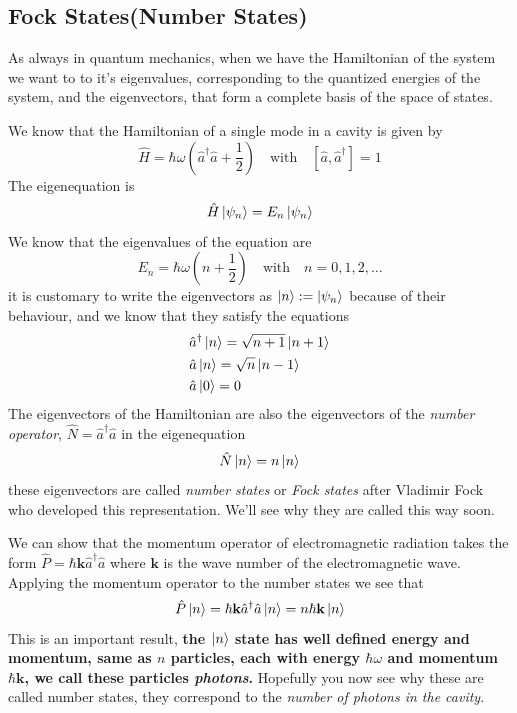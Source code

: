 \documentclass[english, a4paper, 12pt, twoside]{article}
\numberwithin{equation}{section} %
\begin{document}

\subsection{Fock States(Number States)}
As always in quantum mechanics, when we have the Hamiltonian of the system we want to to it's eigenvalues, corresponding to the quantized energies of the system, and the eigenvectors, that form a complete basis of the space of states.

We know that the Hamiltonian of a single mode in a cavity is given by
\[
    \hat{H} = \hbar \omega (\hat{a}^\dag \hat{a} + \frac{1}{2}) \quad \text{with} \quad [\hat{a}, \hat{a}^\dag] = 1
\]
The eigenequation is
\[
    \hat{H}\ket{\psi_n} = E_n \ket{\psi_n}
\]
We know that the eigenvalues of the equation are
\[
    E_n = \hbar \omega (n + \frac{1}{2}) \quad \text{with} \quad n = 0, 1, 2, \dots
\]
it is customary to write the eigenvectors as $\ket{n} := \ket{\psi_n}$ because of their behaviour, and we know that they satisfy the equations
\begin{align*}
    &\hat{a}^\dag \ket{n} = \sqrt{n+1}\ket{n+1} \\
    &\hat{a} \ket{n} = \sqrt{n}\ket{n-1} \\
    &\hat{a}\ket{0} = 0
\end{align*}
The eigenvectors of the Hamiltonian are also the eigenvectors of the \textit{number operator}, $\hat{N} = \hat{a}^\dag \hat{a}$ in the eigenequation
\[
    \hat{N}\ket{n} = n\ket{n}
\]
these eigenvectors are called \textit{number states} or \textit{Fock states} after Vladimir Fock who developed this representation. We'll see why they are called this way soon.

We can show that the momentum operator of electromagnetic radiation takes the form $\hat{P} = \hbar \textbf{k} \hat{a}^\dag \hat{a}$ where $\textbf{k}$ is the wave number of the electromagnetic wave. Applying the momentum operator to the number states we  see that
\[
    \hat{P}\ket{n} =  \hbar \textbf{k} \hat{a}^\dag \hat{a} \ket{n} = n\hbar \textbf{k}\ket{n}
\]
This is an important result, \textbf{the $\ket{n}$ state has well defined energy and momentum, same as $n$ particles, each with energy $\hbar \omega$ and momentum $\hbar \textbf{k}$, we call these particles \textit{photons}.} Hopefully you now see why these are called number states, they correspond to the \textit{number of photons in the cavity}.
\end{document}
